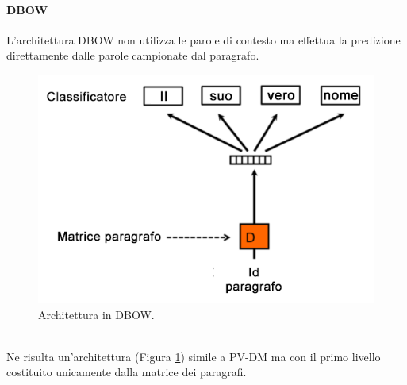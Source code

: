 \documentclass[12pt]{report}
\theoremstyle{definition}
\begin{document}
\paragraph{DBOW}
L'architettura DBOW non utilizza le parole di contesto ma effettua la predizione direttamente dalle parole campionate dal paragrafo.
\\
\begin{figure}
    \centering
    \includegraphics[scale = 0.45]{images/dbow.png}
    \caption{Architettura in DBOW.}
    \label{dbow}
\end{figure}
\\
Ne risulta un'architettura (Figura \ref{dbow}) simile a PV-DM ma con il primo livello costituito unicamente dalla matrice dei paragrafi.
\end{document}
